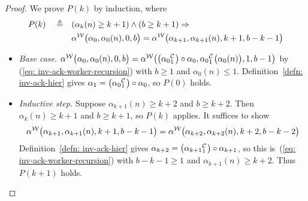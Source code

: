 \begin{proof}
	 We prove $P(k)$ by induction, where
	 \begin{equation*}
	 \begin{aligned}
	 P(k) \quad \triangleq \quad & (\alpha_k(n)\ge k+1) \wedge (b\ge k+1) \implies \null \\ & \alpha^{\W}\big(\alpha_0, \alpha_0(n), 0, b\big) = \alpha^{\W}\big(\alpha_{k+1}, \alpha_{k+1}(n), k+1, b-k-1\big)
	 \end{aligned}
	 \end{equation*}
	\begin{itemize}[leftmargin=*]
		\item \emph{Base case}. $\alpha^{\W}\big(\alpha_0, \alpha_0(n), 0, b\big) = \alpha^{\W}\big(\cdt{\big(\alpha_0}{1}\big)\circ \alpha_0, \cdt{\alpha_0}{1}\big(\alpha_0(n)\big), 1, b - 1\big) $ by
		(\ref{eq: inv-ack-worker-recursion}) with $b\ge 1$ and $\alpha_0(n)\le 1$.
		Definition~\ref{defn: inv-ack-hier} gives $\alpha_1 = \big(\cdt{\alpha_0}{1}\big) \circ \alpha_0$, so $P(0)$ holds.
		
		\item \emph{Inductive step.} Suppose $\alpha_{k+1}(n)\ge k+2$ and $b\ge k+2$. Then $\alpha_k(n)\ge k+1$ and $b\ge k+1$, so $P(k)$ applies. It suffices to show
		\begin{equation*}
		\alpha^{\mathcal{W}}\big(\alpha_{k+1}, \alpha_{k+1}(n), k+1, b-k-1\big)
		= \alpha^{\mathcal{W}}\big(\alpha_{k+2}, \alpha_{k+2}(n), k+2, b-k-2\big)
		\end{equation*}
		Definition~\ref{defn: inv-ack-hier} gives $\alpha_{k+2} = \big(\cdt{\alpha_{k+1}}{1}\big)\circ \alpha_{k+1}$, so this 
		is~(\ref{eq: inv-ack-worker-recursion}) with $b - k - 1\ge 1$ and $\alpha_{k+1}(n)\ge k+2$. Thus $P(k+1)$ holds. 
	\end{itemize}
\end{proof}
